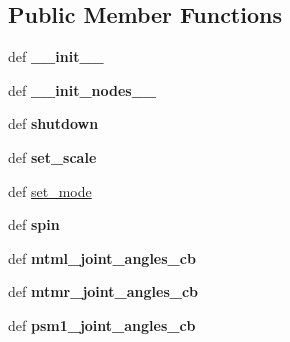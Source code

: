 \subsection*{Public Member Functions}
\begin{DoxyCompactItemize}
\item 
\hypertarget{classcamera__control__node_1_1ClutchControl_a329ec738b20b42ee63fc6c0e50c0aec9}{def {\bfseries \-\_\-\-\_\-init\-\_\-\-\_\-}}\label{classcamera__control__node_1_1ClutchControl_a329ec738b20b42ee63fc6c0e50c0aec9}

\item 
\hypertarget{classcamera__control__node_1_1ClutchControl_a2eaba1eb89de4f4189f461cec9287fed}{def {\bfseries \-\_\-\-\_\-init\-\_\-nodes\-\_\-\-\_\-}}\label{classcamera__control__node_1_1ClutchControl_a2eaba1eb89de4f4189f461cec9287fed}

\item 
\hypertarget{classcamera__control__node_1_1ClutchControl_a20cd96e63d4f300e4f01f1dc4bf262f5}{def {\bfseries shutdown}}\label{classcamera__control__node_1_1ClutchControl_a20cd96e63d4f300e4f01f1dc4bf262f5}

\item 
\hypertarget{classcamera__control__node_1_1ClutchControl_a1d68c26ba090afa32862efeb1c13633f}{def {\bfseries set\-\_\-scale}}\label{classcamera__control__node_1_1ClutchControl_a1d68c26ba090afa32862efeb1c13633f}

\item 
def \hyperlink{classcamera__control__node_1_1ClutchControl_adb22cc2cdad0d9eeb9177fd4fb7f39c0}{set\-\_\-mode}
\item 
\hypertarget{classcamera__control__node_1_1ClutchControl_aeccde7deb30d2818014091d903903e88}{def {\bfseries spin}}\label{classcamera__control__node_1_1ClutchControl_aeccde7deb30d2818014091d903903e88}

\item 
\hypertarget{classcamera__control__node_1_1ClutchControl_a6aa54261afbfa7cfd2db59eb0603e87f}{def {\bfseries mtml\-\_\-joint\-\_\-angles\-\_\-cb}}\label{classcamera__control__node_1_1ClutchControl_a6aa54261afbfa7cfd2db59eb0603e87f}

\item 
\hypertarget{classcamera__control__node_1_1ClutchControl_ab436fd936d2dd3a001a019cd1b75b293}{def {\bfseries mtmr\-\_\-joint\-\_\-angles\-\_\-cb}}\label{classcamera__control__node_1_1ClutchControl_ab436fd936d2dd3a001a019cd1b75b293}

\item 
\hypertarget{classcamera__control__node_1_1ClutchControl_a9258ccc6609bd2d0bed2e5dd0daef592}{def {\bfseries psm1\-\_\-joint\-\_\-angles\-\_\-cb}}\label{classcamera__control__node_1_1ClutchControl_a9258ccc6609bd2d0bed2e5dd0daef592}


\end{DoxyCompactItemize}
